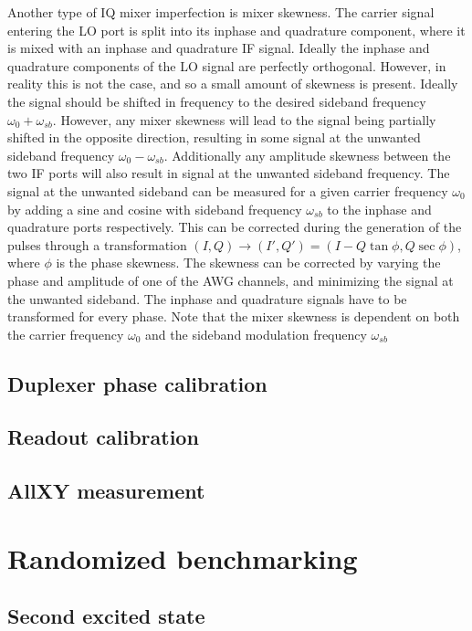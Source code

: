       Another type of IQ mixer imperfection is mixer skewness. The carrier signal entering the LO port is split into its inphase and quadrature component, where it is mixed with an inphase and quadrature IF signal. Ideally the inphase and quadrature components of the LO signal are perfectly orthogonal. However, in reality this is not the case, and so a small amount of skewness is present. Ideally the signal should be shifted in frequency to the desired sideband frequency $\omega_0 + \omega_{sb}$. However, any mixer skewness will lead to the signal being partially shifted in the opposite direction, resulting in some signal at the unwanted sideband frequency $\omega_0 - \omega_{sb}$. Additionally any amplitude skewness between the two IF ports will also result in signal at the unwanted sideband frequency. The signal at the unwanted sideband can be measured for a given carrier frequency $\omega_0$ by adding a sine and cosine with sideband frequency $\omega_{sb}$ to the inphase and quadrature ports respectively.   This can be corrected during the generation of the pulses through a transformation $\left( I, Q \right) \rightarrow \left( I', Q' \right) = \left( I - Q \tan{\phi}, Q \sec{\phi} \right)$, where $\phi$ is the phase skewness. The skewness can be corrected by varying the phase and amplitude of one of the AWG channels, and minimizing the signal at the unwanted sideband. The inphase and quadrature signals have to be transformed for every phase. Note that the mixer skewness is dependent on both the carrier frequency $\omega_0$ and the sideband modulation frequency $\omega_{sb}$

    \section{Duplexer phase calibration}
    \section{Readout calibration}
    \section{AllXY measurement}

  \chapter{Randomized benchmarking}

    \section{Second excited state}